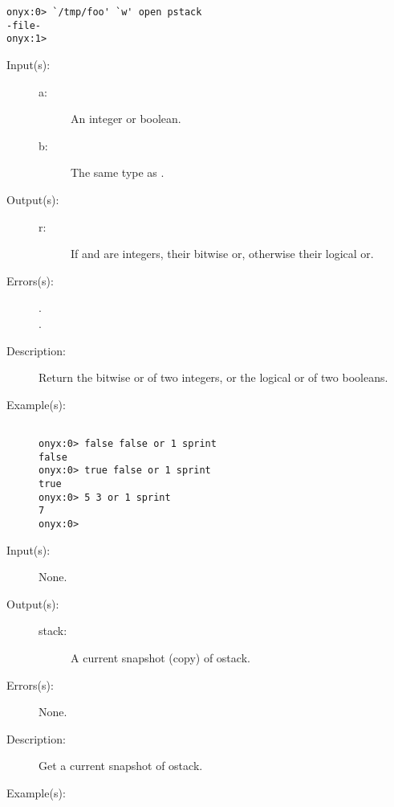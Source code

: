 \begin{description}
\begin{description}
\begin{verbatim}
onyx:0> `/tmp/foo' `w' open pstack
-file-
onyx:1>
		\end{verbatim}
	\end{description}
\label{systemdict:or}
\item[{\onyxop{a b}{or}{r}}: ]
	\begin{description}\item[]
	\item[Input(s): ]
		\begin{description}\item[]
		\item[a: ]
			An integer or boolean.
		\item[b: ]
			The same type as .
		\end{description}
	\item[Output(s): ]
		\begin{description}\item[]
		\item[r: ]
			If  and  are integers, their bitwise
			or, otherwise their logical or.
		\end{description}
	\item[Errors(s): ]
		\begin{description}\item[]
		\item[.]
		\item[.]
		\end{description}
	\item[Description: ]
		Return the bitwise or of two integers, or the logical or of
		two booleans.
	\item[Example(s): ]\begin{verbatim}

onyx:0> false false or 1 sprint
false
onyx:0> true false or 1 sprint
true
onyx:0> 5 3 or 1 sprint
7
onyx:0>
		\end{verbatim}
	\end{description}
\label{systemdict:ostack}
\item[{\onyxop{--}{ostack}{stack}}: ]
	\begin{description}\item[]
	\item[Input(s): ] None.
	\item[Output(s): ]
		\begin{description}\item[]
		\item[stack: ]
			A current snapshot (copy) of ostack.
		\end{description}
	\item[Errors(s): ] None.
	\item[Description: ]
		Get a current snapshot of ostack.
	\item[Example(s): ]\begin{verbatim}


\end{verbatim}
\end{description}
\end{description}
